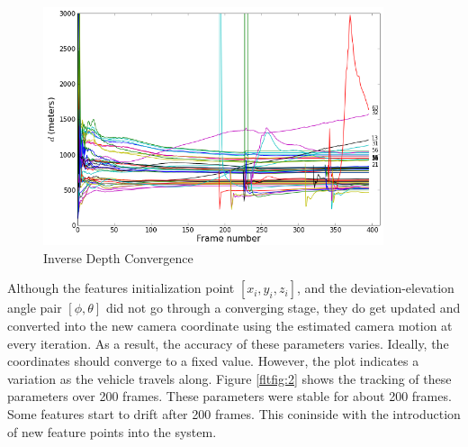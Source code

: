 \begin{figure}[h]
\centering
\includegraphics[width=10cm, keepaspectratio=true]{./Figures/fltfig/cut1/Figure10.png}
\caption{Inverse Depth Convergence}
\label{fltfig:1}
\end{figure}

Although the features initialization point $[x_i, y_i, z_i]$, and the
deviation-elevation angle pair $[\phi, \theta]$ did not go through a
converging stage, they do get updated and converted into the new
camera coordinate using the estimated camera motion at every
iteration. As a result, the accuracy of these parameters varies.
Ideally, the coordinates should converge to a fixed value. However,
the plot indicates a variation as the vehicle travels along. Figure
\ref{fltfig:2} shows the tracking of these parameters over 200 frames.
These parameters were stable for about 200 frames. Some features start
to drift after 200 frames. This coninside with the introduction of new
feature points into the system.
 
